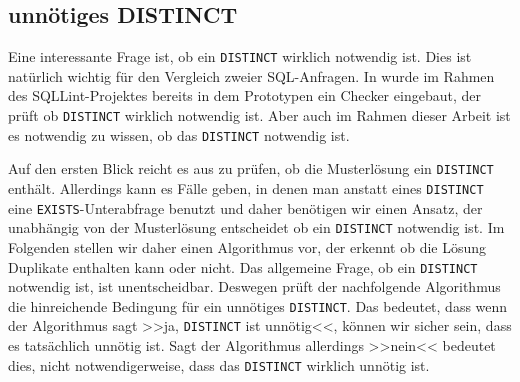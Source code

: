 %



\subsection{unnötiges DISTINCT}

Eine interessante Frage ist, ob ein \verb|DISTINCT| wirklich notwendig ist. Dies ist natürlich wichtig für den Vergleich zweier SQL-Anfragen. In \cite{brass2} wurde im Rahmen des SQLLint-Projektes bereits in dem Prototypen ein Checker eingebaut, der prüft ob \verb|DISTINCT| wirklich notwendig ist. Aber auch im Rahmen dieser Arbeit ist es notwendig zu wissen, ob das \verb|DISTINCT| notwendig ist. 

Auf den ersten Blick reicht es aus zu prüfen, ob die Musterlösung ein \verb|DISTINCT| enthält. Allerdings kann es Fälle geben, in denen man anstatt eines \verb|DISTINCT| eine \verb|EXISTS|-Unterabfrage benutzt und daher benötigen wir einen Ansatz, der unabhängig von der Musterlösung entscheidet ob ein \verb|DISTINCT| notwendig ist.  Im Folgenden stellen wir daher einen Algorithmus vor, der erkennt ob die Lösung Duplikate enthalten kann oder nicht. Das allgemeine Frage, ob ein \verb|DISTINCT| notwendig ist, ist unentscheidbar. Deswegen prüft der nachfolgende Algorithmus die hinreichende Bedingung für ein unnötiges \verb|DISTINCT|. Das bedeutet, dass wenn der Algorithmus sagt >>ja, \verb|DISTINCT| ist unnötig<<, können wir sicher sein, dass es tatsächlich unnötig ist. Sagt der Algorithmus allerdings >>nein<< bedeutet dies, nicht notwendigerweise, dass das \verb|DISTINCT| wirklich unnötig ist. 

